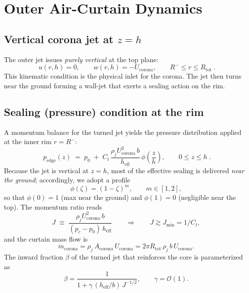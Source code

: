 \documentclass[11pt,a4paper]{article}
\begin{document}
\section{Outer Air-Curtain Dynamics}
\subsection{Vertical corona jet at \texorpdfstring{$z=h$}{z=h}}
\label{subsec:vertical-jet}
The outer jet issues \emph{purely vertical} at the top plane:
\begin{equation}
  \boxed{ \ u(r,h)=0,\qquad w(r,h)=-U_{\mathrm{corona}},\qquad R^-\le r\le R_{\text{tot}} \ }.
  \label{eq:verticalBC}
\end{equation}
This kinematic condition is the physical inlet for the corona. The jet then turns near the ground forming a wall-jet that exerts a sealing action on the rim.

\subsection{Sealing (pressure) condition at the rim}
A momentum balance for the turned jet yields the pressure distribution applied at the inner rim $r=R^-$:
\begin{equation}
  \boxed{\
  p_\mathrm{edge}(z) \;=\; p_0 \;+\;
  C_t\,\frac{\rho_j U_{\mathrm{corona}}^{2}\,b}{h_{\mathrm{eff}}}\,\phi\!\left(\frac{z}{h}\right),
  \qquad 0\le z\le h \ }.
  \label{eq:curtain_force}
\end{equation}
Because the jet is vertical at $z=h$, most of the effective sealing is delivered \emph{near the ground}; accordingly, we adopt a profile
\begin{equation}
  \phi(\zeta)=(1-\zeta)^{m},\qquad m\in[1,2],
  \label{eq:phi}
\end{equation}
so that $\phi(0)=1$ (max near the ground) and $\phi(1)=0$ (negligible near the top). The momentum ratio reads
\begin{equation}
  J \;\equiv\; \frac{\rho_j U_{\mathrm{corona}}^{2}\,b}{(p_c-p_0)\,h_{\mathrm{eff}}}
  \qquad\Rightarrow\qquad J\gtrsim J_{\min}=1/C_t,
  \label{eq:J}
\end{equation}
and the curtain mass flow is
\begin{equation}
  \dot m_{\mathrm{corona}} = \rho_j\,A_{\mathrm{corona}}\,U_{\mathrm{corona}}
  = 2\pi R_{\text{tot}}\,\rho_j\,b\,U_{\mathrm{corona}}.
  \label{eq:mcorona}
\end{equation}
The inward fraction $\beta$ of the turned jet that reinforces the core is parameterized as
\begin{equation}
  \beta = \frac{1}{1+\gamma\,(h_{\mathrm{eff}}/b)\,J^{-1/2}},\qquad \gamma=\mathcal{O}(1).
  \label{eq:beta}
\end{equation}
\end{document}

